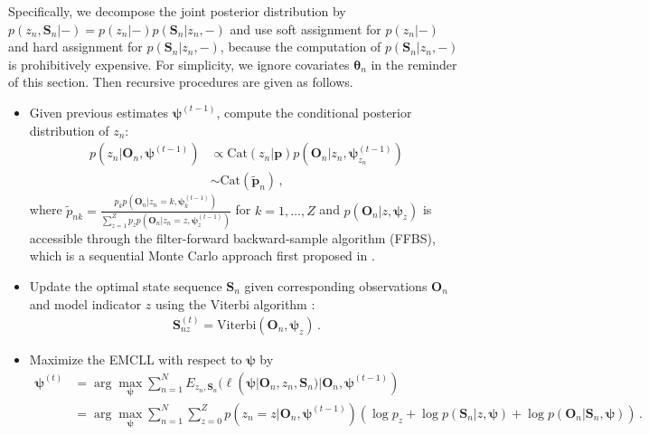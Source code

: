 \documentclass{article}
\begin{document}
Specifically, we decompose the joint posterior distribution by $p(z_n, \bm S_n| -) = p(z_n| - )p(\bm S_n| z_n, -)$ and use soft assignment for $p(z_n| -)$ and hard assignment for $p(\bm S_n| z_n, -)$, because the computation of $p(\bm S_n|z_n, -)$ is prohibitively expensive. For simplicity, we ignore covariates $\bm{\theta}_n$ in the reminder of this section. Then recursive procedures are given as follows.
\begin{itemize}
	\item Given previous estimates $\bm \psi^{(t-1)}$, compute the conditional posterior distribution of $z_n$:
	\begin{align}
	p(z_n|\bm O_n, \bm \psi^{(t-1)}) & \propto \mathrm{Cat}(z_n|\bm p)p(\bm O_n| z_n, \bm\psi^{(t-1)}_{z_n}) \nonumber \\
	& \sim \mathrm{Cat}(\tilde{\bm p}_n)\,,
	\label{Pos_I}
	\end{align}
	where $\tilde{p}_{nk} = \frac{p_k p(\bm O_n| z_n = k, \bm{\psi}^{(t-1)}_k)}{\sum_{z = 1}^{Z}p_z p(\bm O_n | z_n = z, \bm\psi^{(t-1)}_z)}$ for $k = 1, \ldots, Z$ and $p(\bm O_n | z, \bm \psi_{z})$ is accessible through the filter-forward backward-sample algorithm (FFBS), which is a sequential Monte Carlo approach first proposed in \cite{Kitagawa_1987}.
	\item Update the optimal state sequence $\bm S_n$ given corresponding observations $\bm O_n$ and model indicator $z$ using the Viterbi algorithm \citep{Forney_1973}: 
	\begin{align}
	\bm S^{(t)}_{nz} = \mathrm{Viterbi}(\bm O_n, \bm \psi_z)\,.
	\label{Pos_S}
	\end{align}
	\item Maximize the EMCLL with respect to $\bm \psi$ by
	\begin{align}
	\bm \psi^{(t)} & = \arg\max\limits_{\bm{\psi}}\sum_{n=1}^{N}E_{z_n, \bm S_n}(\ell(\bm \psi| \bm O_n, z_n, \bm S_n)| \bm O_n, \bm \psi^{(t-1)}) \nonumber \\ 
	& =   \arg\max\limits_{\bm{\psi}} \sum_{n = 1}^{N}\sum_{z = 0}^{Z}p(z_n = z| \bm O_n, \bm \psi^{(t-1)})  \left(\log p_z + \log p(\bm S_n | z, \bm \psi) + \log p(\bm O_n| \bm S_n, \bm \psi) \right)\,.
	\label{M_step}
	\end{align}
\end{itemize}
\end{document}
